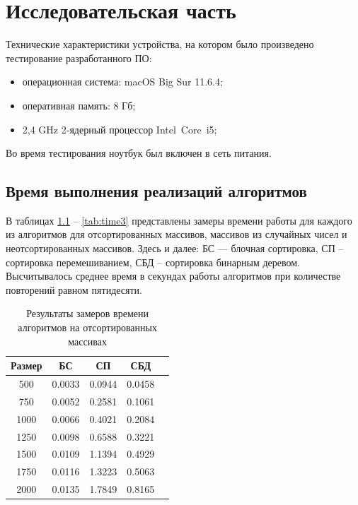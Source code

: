 \chapter{Исследовательская часть}

Технические характеристики устройства, на котором было произведено тестирование разработанного ПО: 

\begin{itemize}
	\item операционная система: macOS Big Sur 11.6.4;
	\item оперативная память: 8 Гб;
	\item 2,4 GHz 2‑ядерный процессор Intel Core i5;
\end{itemize}

Во время тестирования ноутбук был включен в сеть питания.

\section{Время выполнения реализаций алгоритмов}

В таблицах \ref{tab:time1} -- \ref{tab:time3} представлены замеры времени работы для каждого из алгоритмов для отсортированных массивов, массивов из случайных чисел и неотсортированных массивов. Здесь и далее: БС — блочная сортировка, СП -- сортировка перемешиванием, СБД -- сортировка бинарным деревом. Высчитывалось среднее время в секундах работы алгоритмов при количестве повторений равном пятидесяти.

\begin{table}[h]
	\begin{center}
		\caption{\label{tab:time1}Результаты замеров времени алгоритмов на отсортированных массивах}
		\begin{tabular}{|c|c|c|c|c|}
		\hline
		Размер & БС &  СП & СБД \\
		\hline
		500  & 0.0033 & 0.0944 & 0.0458\\
		\hline
		750  & 0.0052 & 0.2581 & 0.1061\\
		\hline
		1000  & 0.0066 & 0.4021 & 0.2084 \\
		\hline
		1250  & 0.0098 & 0.6588 & 0.3221 \\
		\hline
		1500  & 0.0109 & 1.1394 & 0.4929 \\ 
		\hline
		1750  & 0.0116 & 1.3223 & 0.5063 \\
		\hline
		2000  & 0.0135 & 1.7849 & 0.8165 \\
		\hline
		\end{tabular}
	\end{center}
\end{table}

